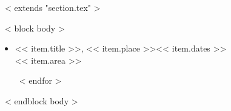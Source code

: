 ~< extends "section.tex" >~

~< block body >~
  \begin{itemize}
    ~< for item in items >~
      \item << item.title >>, << item.place >>\hfill << item.dates >> \\
        << item.area >>

    ~< endfor >~
  \end{itemize}
~< endblock body >~
